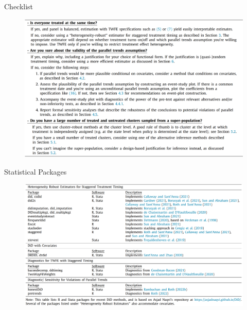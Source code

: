 \documentclass{beamer}
\begin{document}
\begin{frame}{Checklist \citep{roth2023s}}
	\begin{figure}
		\centering
		\includegraphics[width=\linewidth]{./Figures/DiDalghorithm.png}
	\end{figure}
\end{frame}

\begin{frame}{Statistical Packages \citep{roth2023s}}
	\begin{figure}
		\centering
		\includegraphics[width=\linewidth]{./Figures/DiDpackages.png}
	\end{figure}
\end{frame}
\end{document}
